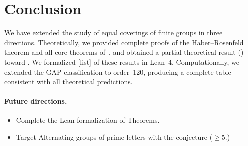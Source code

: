 \documentclass[12pt, a4paper]{article}
\theoremstyle{plain}
\theoremstyle{definition}
\begin{document}
\section{Conclusion}
\label{sec:conclusion}

We have extended the study of equal coverings of finite groups in three directions.
Theoretically, we provided complete proofs of the Haber--Rosenfeld theorem and all
core theorems of~\cite{velasquez2022}, and obtained a partial theoretical result
() toward .
We formalized [list] of these results in Lean~4.
Computationally, we extended the GAP classification to order~120, producing a
complete table consistent with all theoretical predictions.

\paragraph{Future directions.}
\begin{itemize}
  \item Complete the Lean formalization of Theorems.
  \item Target Alternating groups of prime letters with the conjecture ($\geq 5$.)
\end{itemize}


\newpage







\end{document}
